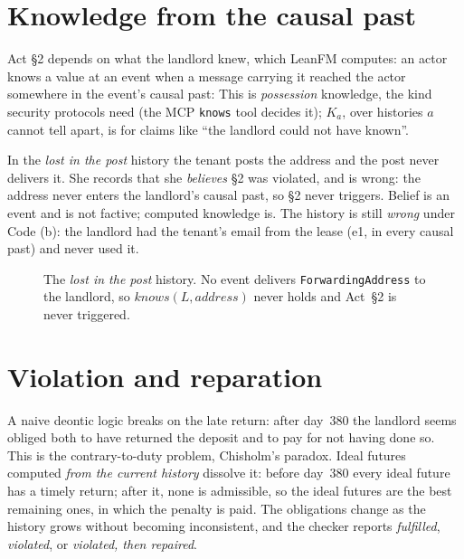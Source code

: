 \section{Knowledge from the causal past}

Act \S2 depends on what the landlord knew, which LeanFM computes: an actor knows a
value at an event when a message carrying it reached the actor somewhere in the
event's causal past:
This is \emph{possession} knowledge, the kind security protocols need (the MCP
\texttt{knows} tool decides it); $K_a$, over histories $a$ cannot tell apart, is
for claims like ``the landlord could not have known''.

In the \emph{lost in the post} history the tenant posts the address and the post
never delivers it. She records that she \emph{believes} \S2 was violated, and is
wrong: the address never enters the landlord's causal past, so \S2 never
triggers. Belief is an event and is not factive; computed knowledge is. The history
is still \emph{wrong} under Code (b): the landlord had the tenant's email from the
lease (e1, in every causal past) and never used it.

\begin{figure}[ht]
\centering
{}
\caption{The \emph{lost in the post} history. No event delivers \texttt{ForwardingAddress} to the landlord, so $\mathit{knows}(L,\mathit{address})$ never holds and Act~\S2 is never triggered.}
\end{figure}

\section{Violation and reparation}

A naive deontic logic breaks on the late return: after day~380 the landlord seems
obliged both to have returned the deposit and to pay for not having done so. This
is the contrary-to-duty problem, Chisholm's paradox. Ideal futures computed
\emph{from the current history} dissolve it: before day~380 every ideal future has
a timely return; after it, none is admissible, so the ideal futures are the best
remaining ones, in which the penalty is paid. The obligations change as the history
grows without becoming inconsistent, and the checker reports \emph{fulfilled},
\emph{violated}, or \emph{violated, then repaired}.

